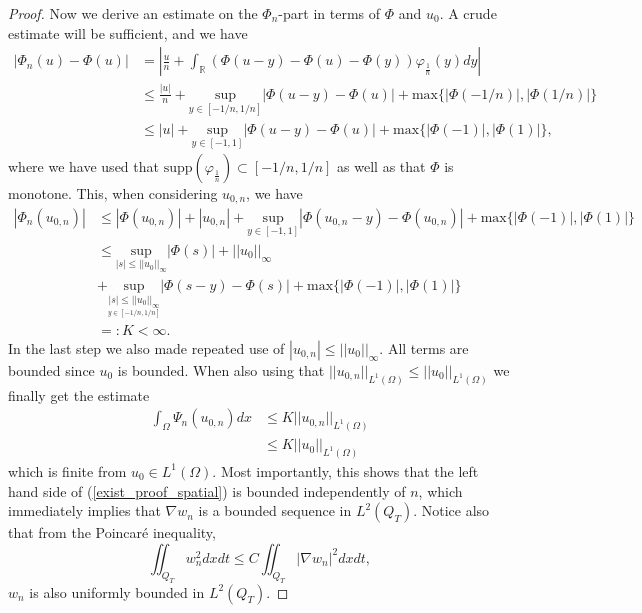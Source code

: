 \documentclass[11pt, a4paper]{article}
\begin{document}
\begin{proof}
	
	Now we derive an estimate on the $\Phi_n$-part in terms of $\Phi$ and $u_0$. A crude estimate will be sufficient, and we have
	\begin{align*}
	|\Phi_n(u) - \Phi(u)| &= \left|\frac{u}{n} + \int_\mathbb{R}\left( \Phi(u-y) - \Phi(u) - \Phi(y)\right)\varphi_{\frac{1}{n}}(y)dy \right| \\
	&\leq \frac{|u|}{n} + \underset{y\in [-1/n, 1/n]}{\mathrm{sup}}|\Phi(u-y) - \Phi(u)| + \mathrm{max}\{|\Phi(-1/n)|, |\Phi(1/n)|\} \\
	&\leq |u| + \underset{y\in [-1, 1]}{\mathrm{sup}}|\Phi(u-y) - \Phi(u)| +\mathrm{max}\{|\Phi(-1)|, |\Phi(1)|\},
	\end{align*}
	where we have used that $\mathrm{supp}(\varphi_{\frac{1}{n}})\subset [-1/n, 1/n]$ as well as that $\Phi$ is monotone. This, when considering $u_{0,n}$, we have
	\begin{align*}
	|\Phi_n(u_{0,n})| &\leq |\Phi(u_{0,n})| + |u_{0,n}| + \underset{y\in [-1, 1]}{\mathrm{sup}}|\Phi(u_{0,n}-y) - \Phi(u_{0,n})| +\mathrm{max}\{|\Phi(-1)|, |\Phi(1)|\} \\
	& \leq \underset{|s| \leq ||u_0||_\infty}{\mathrm{sup}}|\Phi(s)| + ||u_0||_{\infty}\\
	& + \underset{\underset{y\in[-1/n,1/n]}{|s| \leq ||u_0||_{\infty}}}{\mathrm{sup}}|\Phi(s-y) - \Phi(s)| + \mathrm{max}\{|\Phi(-1)|, |\Phi(1)|\} \\
	&=: K < \infty.
	\end{align*}
	In the last step we also made repeated use of $|u_{0,n}| \leq ||u_0||_\infty$.
	All terms are bounded since $u_0$ is bounded. When also using that $||u_{0,n}||_{L^1(\Omega)} \leq ||u_0||_{L^1(\Omega)}$ we finally get the estimate
	\begin{align*}
	\int_\Omega \Psi_n(u_{0,n})dx &\leq K ||u_{0,n}||_{L^1(\Omega)} \\
	&\leq K ||u_0||_{L^1(\Omega)}
	\end{align*}
	which is finite from $u_0 \in L^1(\Omega)$. Most importantly, this shows that the left hand side of (\ref{exist_proof_spatial}) is bounded independently of $n$, which immediately implies that $\nabla w_n$ is a bounded sequence in $L^2(Q_T)$. Notice also that from the Poincaré inequality,
	\begin{equation*}
	\iint_{Q_T}w_n^2 dxdt \leq C\iint_{Q_T} |\nabla w_n|^2dxdt,	
	\end{equation*}
	$w_n$ is also uniformly bounded in $L^2(Q_T)$.
\end{proof}
\end{document}
